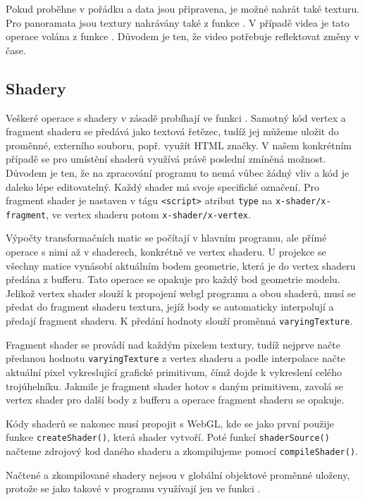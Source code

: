 Pokud  \texttt{\setupProgram} proběhne v pořádku a  data jsou připravena, je možné nahrát také texturu. Pro panoramata jsou textury nahrávány také z funkce \texttt{\setupProgram}. V případě videa je tato operace  volána z funkce \texttt{\render}. Důvodem je ten, že video potřebuje reflektovat změny v čase.



\subsection{Shadery}
Veškeré operace s shadery v zásadě probíhají ve funkci \texttt{\setupProgram}. Samotný kód vertex a fragment shaderu se předává jako textová řetězec, tudíž jej můžeme uložit do proměnné, externího souboru, popř. využít HTML značky. V našem konkrétním případě  se pro umístění shaderů využívá právě poslední zmíněná možnost. Důvodem je ten, že na zpracování programu to nemá vůbec žádný vliv  a  kód je daleko lépe editovatelný. Každý shader má svoje specifické označení. Pro fragment shader je nastaven v tágu \texttt{<script>} atribut \texttt{type} na \texttt{x-shader/x-fragment}, ve vertex shaderu potom \texttt{x-shader/x-vertex}.

Výpočty transformačních matic se počítají v hlavním programu, ale přímé operace s nimi až v shaderech, konkrétně ve vertex shaderu. U projekce se všechny matice  vynásobí aktuálním bodem geometrie, která je do vertex shaderu předána z bufferu. Tato operace se opakuje pro každý bod geometrie modelu. Jelikož vertex shader slouží k propojení webgl programu  a obou shaderů, musí se předat do fragment shaderu textura, jejíž body se automaticky interpolují a předají fragment shaderu. K předání hodnoty slouží proměnná \texttt{varyingTexture}.

Fragment shader se provádí nad každým pixelem textury, tudíž nejprve načte předanou hodnotu \texttt{varyingTexture} z vertex shaderu a podle interpolace načte aktuální pixel vykreslující grafické primitivum, čímž dojde k vykreslení celého trojúhelníku. Jakmile je fragment shader hotov s daným primitivem, zavolá se vertex shader pro další body z bufferu a operace fragment shaderu se opakuje.

Kódy shaderů se nakonec musí propojit s WebGL, kde se jako první použije funkce \texttt{createShader()}, která shader vytvoří. Poté funkcí \texttt{shaderSource()} načteme zdrojový kod daného shaderu a zkompilujeme pomocí \texttt{compileShader()}.

Načtené a zkompilované shadery nejsou v globální objektové proměnné uloženy, protože se jako takové v programu využívají jen ve funkci \texttt{\setupProgram}.


